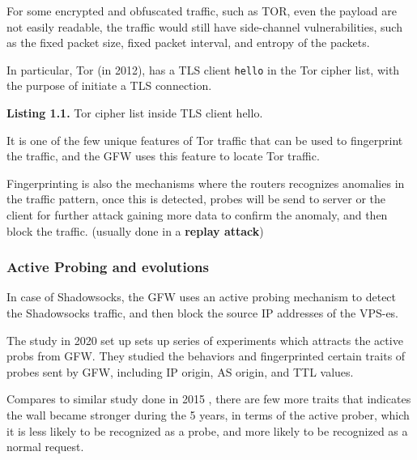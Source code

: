 For some encrypted and obfuscated traffic, such as TOR, even the payload
are not easily readable, the traffic would still have side-channel
vulnerabilities, such as the fixed packet size, fixed packet interval,
and entropy of the packets. \cite{50_tor_finger} \cite{56_gfwTOR}
\cite{57_blockingTor}

In particular, Tor (in 2012), has a TLS client \texttt{hello} in the Tor
cipher list, with the purpose of initiate a TLS connection.

\begin{Shaded}
\begin{Highlighting}[]
\end{Highlighting}
\end{Shaded}

\textbf{Listing 1.1.} Tor cipher list inside TLS client hello.

It is one of the few unique features of Tor traffic that can be used to
fingerprint the traffic, and the GFW uses this feature to locate Tor
traffic.

Fingerprinting is also the mechanisms where the routers recognizes
anomalies in the traffic pattern, \cite{26_gfwSS2020} once this is
detected, probes will be send to server or the client for further attack
gaining more data to confirm the anomaly, and then block the traffic.
(usually done in a \textbf{replay attack})

\hypertarget{active-probing-and-evolutions}{%
\subsubsection{Active Probing and
evolutions}\label{active-probing-and-evolutions}}

In case of Shadowsocks, the GFW uses an active probing mechanism to
detect the Shadowsocks traffic, and then block the source IP addresses
of the VPS-es.

The study in 2020 set up sets up series of experiments which attracts
the active probs from GFW. They studied the behaviors and fingerprinted
certain traits of probes sent by GFW, including IP origin, AS origin,
and TTL values.

Compares to similar study done in 2015 \cite{46_gfw-discover}, there are
few more traits that indicates the wall became stronger during the 5
years, in terms of the active prober, which it is less likely to be
recognized as a probe, and more likely to be recognized as a normal
request.


